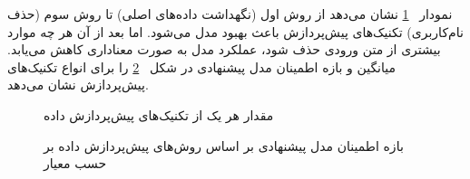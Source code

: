 نمودار
~\ref{data-cleaning-impact-chart}
نشان می‌دهد از روش اول (نگهداشت داده‌های اصلی) تا روش سوم (حذف نام‌کاربری) تکنیک‌های پیش‌پردازش باعث بهبود مدل می‌شود. اما بعد از آن هر چه موارد بیشتری از متن ورودی حذف شود، عملکرد مدل به صورت معناداری کاهش می‌یابد. میانگین و بازه اطمینان مدل پیشنهادی در شکل~
\ref{data-cleaning-impact-bar-chart}
را برای انواع تکنیک‌های پیش‌پردازش نشان می‌دهد.

\begin{figure}[H]
	\caption{مقدار
هر یک از تکنیک‌های پیش‌پردازش داده}
	\label{data-cleaning-impact-chart}
\end{figure}

\begin{figure}[H]
	\caption[بازه اطمینان مدل پیشنهادی بر اساس روش‌های پیش‌پردازش داده]{بازه اطمینان مدل پیشنهادی بر اساس روش‌های پیش‌پردازش داده بر حسب معیار
		}
	\label{data-cleaning-impact-bar-chart}
\end{figure}

